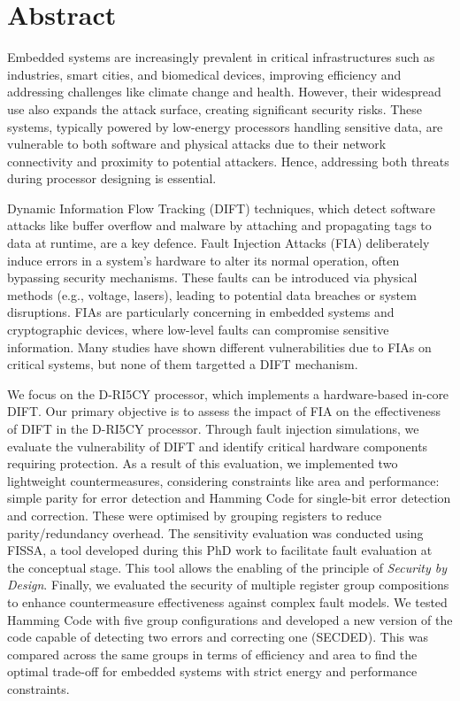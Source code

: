 \chapter*{Abstract}
\label{chapter:abstract}
\minitoc

Embedded systems are increasingly prevalent in critical infrastructures such as industries, smart cities, and biomedical devices, improving efficiency and addressing challenges like climate change and health. However, their widespread use also expands the attack surface, creating significant security risks. These systems, typically powered by low-energy processors handling sensitive data, are vulnerable to both software and physical attacks due to their network connectivity and proximity to potential attackers. Hence, addressing both threats during processor designing is essential.

Dynamic Information Flow Tracking (DIFT) techniques, which detect software attacks like buffer overflow and malware by attaching and propagating tags to data at runtime, are a key defence.
Fault Injection Attacks (FIA) deliberately induce errors in a system's hardware to alter its normal operation, often bypassing security mechanisms. These faults can be introduced via physical methods (e.g., voltage, lasers), leading to potential data breaches or system disruptions. FIAs are particularly concerning in embedded systems and cryptographic devices, where low-level faults can compromise sensitive information. Many studies have shown different vulnerabilities due to FIAs on critical systems, but none of them targetted a DIFT mechanism.

We focus on the \mbox{D-RI5CY} processor, which implements a hardware-based in-core DIFT. Our primary objective is to assess the impact of FIA on the effectiveness of DIFT in the \mbox{D-RI5CY} processor. Through fault injection simulations, we evaluate the vulnerability of DIFT and identify critical hardware components requiring protection. 
As a result of this evaluation, we implemented two lightweight countermeasures, considering constraints like area and performance: simple parity for error detection and Hamming Code for single-bit error detection and correction. These were optimised by grouping registers to reduce parity/redundancy overhead. The sensitivity evaluation was conducted using FISSA, a tool developed during this PhD work to facilitate fault evaluation at the conceptual stage. This tool allows the enabling of the principle of \textit{Security by Design}.
Finally, we evaluated the security of multiple register group compositions to enhance countermeasure effectiveness against complex fault models. We tested Hamming Code with five group configurations and developed a new version of the code capable of detecting two errors and correcting one (SECDED). This was compared across the same groups in terms of efficiency and area to find the optimal trade-off for embedded systems with strict energy and performance constraints.